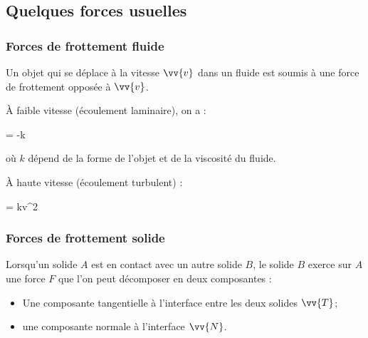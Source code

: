\documentclass{cours}
\begin{document}
\subsection{Quelques forces usuelles}%
\subsubsection{Forces de frottement fluide}%
\label{ssub:forces_de_frottement_fluide}

Un objet qui se déplace à la vitesse $\vv{v}$ dans un fluide est soumis à une force de frottement opposée à $\vv{v}$. 

À faible vitesse (écoulement laminaire), on a :
\begin{eqencadre}
 = -k 
\end{eqencadre}
où $k$ dépend de la forme de l'objet et de la viscosité du fluide. 

À haute vitesse (écoulement turbulent) :
\begin{eqencadre}
 = kv^2
\end{eqencadre}

\subsubsection{Forces de frottement solide}%

Lorsqu'un solide $A$ est en contact avec un autre solide $B$, le solide $B$ exerce sur $A$ une force $F$ que l'on peut décomposer en deux composantes :
\begin{itemize}
  \item Une composante tangentielle à l'interface entre les deux solides $\vv{T}$;
  \item une composante normale à l'interface $\vv{N}$. 
\end{itemize}

\begin{center}
\end{center}
\end{document}
